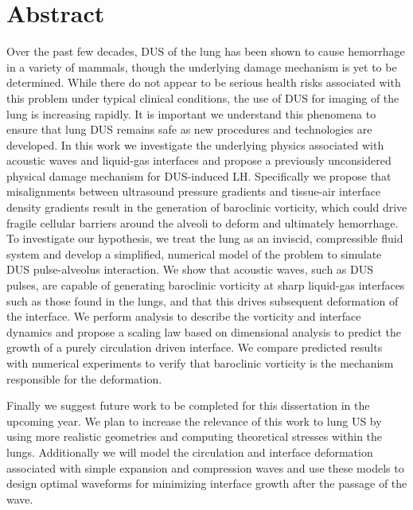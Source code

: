 \section{Abstract}
Over the past few decades, \ac{DUS} of the lung has been shown to
cause hemorrhage in a variety of mammals, though the underlying damage
mechanism is yet to be determined. While there do not appear to be
serious health risks associated with this problem under typical
clinical conditions, the use of \ac{DUS} for imaging of the lung is
increasing rapidly. It is important we understand this phenomena to
ensure that lung \ac{DUS} remains safe as new procedures and
technologies are developed. In this work we investigate the underlying
physics associated with acoustic waves and liquid-gas interfaces and
propose a previously unconsidered physical damage mechanism for
\ac{DUS}-induced \ac{LH}. Specifically we propose that misalignments
between ultrasound pressure gradients and tissue-air interface density
gradients result in the generation of baroclinic vorticity, which
could drive fragile cellular barriers around the alveoli to deform and
ultimately hemorrhage. To investigate our hypothesis, we treat the
lung as an inviscid, compressible fluid system and develop a
simplified, numerical model of the problem to simulate \ac{DUS}
pulse-alveolus interaction. We show that acoustic waves, such as
\ac{DUS} pulses, are capable of generating baroclinic vorticity at
sharp liquid-gas interfaces such as those found in the lungs, and that
this drives subsequent deformation of the interface. We perform
analysis to describe the vorticity and interface dynamics and propose
a scaling law based on dimensional analysis to predict the growth of a
purely circulation driven interface. We compare predicted results with
numerical experiments to verify that baroclinic vorticity is the
mechanism responsible for the deformation. 

Finally we suggest future work to be completed for this dissertation
in the upcoming year. We plan to increase the relevance of this work
to lung \ac{US} by using more realistic geometries and computing
theoretical stresses within the lungs. Additionally we will model the
circulation and interface deformation associated with simple expansion
and compression waves and use these models to design optimal waveforms
for minimizing interface growth after the passage of the wave.

